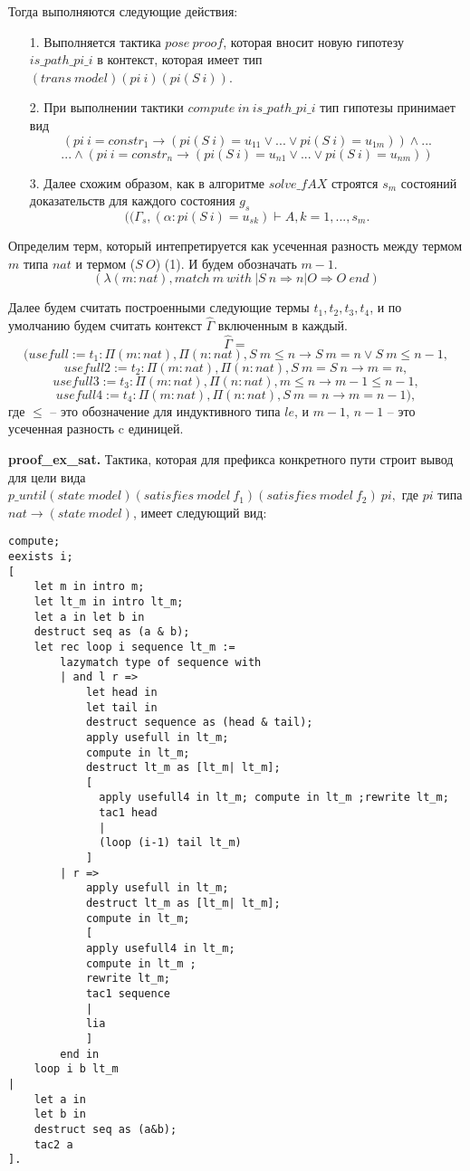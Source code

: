 \documentclass[12pt]{article}
\begin{document}
Тогда выполняются следующие действия:
\begin{enumerate}
\item[1.] Выполняется тактика $pose\ proof$, которая вносит новую гипотезу $is\_path\_pi\_i$ в контекст, которая имеет тип $(trans\ model) (pi\ i) (pi (S\ i))$. 
\item[2.] При выполнении тактики $compute\ in\ is\_path\_pi\_i$ тип гипотезы принимает вид
$$(pi\ i = constr_1 \xrightarrow{} (pi (S\ i)=u_{11} \vee ... \vee pi (S\ i)=u_{1m})) \wedge ... $$
$$... \wedge (pi\ i = constr_n \xrightarrow{} (pi (S\ i)=u_{n1} \vee ... \vee pi (S\ i)=u_{nm}))$$
\item[3.] Далее схожим образом, как в алгоритме $solve\_fAX$ строятся $s_m$ состояний доказательств для каждого состояния $g_s$
$$((\Gamma_s, (\alpha: pi (S\ i)=u_{sk}) \vdash A, k=1,...,s_m.$$
\end{enumerate}

Определим терм, который интепретируется как усеченная разность между термом $m$ типа $nat$ и термом ($S\ O$) (1). И будем обозначать $m - 1$.
$$(\lambda (m:nat), match\ m\ with\ | S\ n \Rightarrow n | O \Rightarrow O\ end)$$

Далее будем считать построенными следующие термы $t_1, t_2, t_3, t_4$, и по умолчанию будем считать контекст $\hat{\Gamma}$ включенным в каждый.
$$\hat{\Gamma} = $$
$$(usefull:=t_1:\Pi (m:nat), \Pi (n:nat), S\ m \leq n \xrightarrow{} S\ m = n \vee S\ m \leq n - 1,$$
$$usefull2:=t_2:\Pi (m:nat), \Pi (n:nat),  S\ m = S\ n \xrightarrow{} m = n,$$
$$usefull3:=t_3:\Pi (m:nat), \Pi (n:nat),  m \leq n \xrightarrow{} m - 1 \leq n - 1,$$
$$usefull4:=t_4:\Pi (m:nat), \Pi (n:nat),  S\ m = n \xrightarrow{} m = n - 1),$$
где $\leq$ -- это обозначение для индуктивного типа $le$, и $m-1$, $n-1$ -- это усеченная разность c единицей. 

\textbf{proof\_ex\_sat.} 
Тактика, которая для префикса конкретного пути строит вывод для цели вида $p\_until (state\ model) (satisfies\ model\ f_1) (satisfies\ model\ f_2)\ pi,$ где $pi$ типа $nat \xrightarrow{} (state\ model)$, имеет следующий вид:

\begin{verbatim}
compute; 
eexists i; 
[
    let m in intro m; 
    let lt_m in intro lt_m;
    let a in let b in
    destruct seq as (a & b);
    let rec loop i sequence lt_m := 
        lazymatch type of sequence with 
        | and l r =>
            let head in
            let tail in
            destruct sequence as (head & tail);
            apply usefull in lt_m;
            compute in lt_m; 
            destruct lt_m as [lt_m| lt_m]; 
            [
              apply usefull4 in lt_m; compute in lt_m ;rewrite lt_m;
              tac1 head
              |
              (loop (i-1) tail lt_m)
            ] 
        | r => 
            apply usefull in lt_m;
            destruct lt_m as [lt_m| lt_m]; 
            compute in lt_m; 
            [
            apply usefull4 in lt_m; 
            compute in lt_m ;
            rewrite lt_m;
            tac1 sequence
            |
            lia
            ]
        end in
    loop i b lt_m
| 
    let a in
    let b in
    destruct seq as (a&b);
    tac2 a
].
\end{verbatim}
\end{document}
